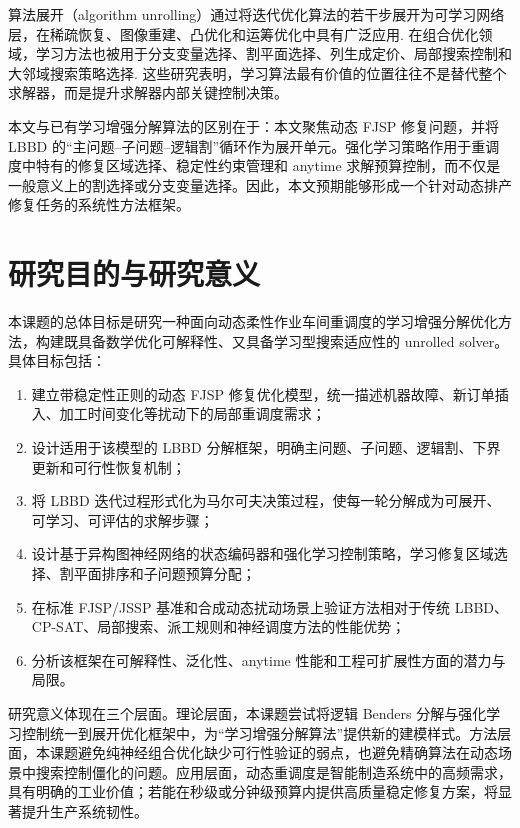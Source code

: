 \documentclass[UTF8,12pt,a4paper]{ctexart}
\begin{document}
算法展开（algorithm unrolling）通过将迭代优化算法的若干步展开为可学习网络层，在稀疏恢复、图像重建、凸优化和运筹优化中具有广泛应用\cite{ref_unrolling}. 在组合优化领域，学习方法也被用于分支变量选择、割平面选择、列生成定价、局部搜索控制和大邻域搜索策略选择\cite{ref_learning_branch,ref_learning_cut,ref_learning_lns}. 这些研究表明，学习算法最有价值的位置往往不是替代整个求解器，而是提升求解器内部关键控制决策。

本文与已有学习增强分解算法的区别在于：本文聚焦动态 FJSP 修复问题，并将 LBBD 的“主问题--子问题--逻辑割”循环作为展开单元。强化学习策略作用于重调度中特有的修复区域选择、稳定性约束管理和 anytime 求解预算控制，而不仅是一般意义上的割选择或分支变量选择。因此，本文预期能够形成一个针对动态排产修复任务的系统性方法框架。

\section{研究目的与研究意义}

本课题的总体目标是研究一种面向动态柔性作业车间重调度的学习增强分解优化方法，构建既具备数学优化可解释性、又具备学习型搜索适应性的 unrolled solver。具体目标包括：

\begin{enumerate}
    \item 建立带稳定性正则的动态 FJSP 修复优化模型，统一描述机器故障、新订单插入、加工时间变化等扰动下的局部重调度需求；
    \item 设计适用于该模型的 LBBD 分解框架，明确主问题、子问题、逻辑割、下界更新和可行性恢复机制；
    \item 将 LBBD 迭代过程形式化为马尔可夫决策过程，使每一轮分解成为可展开、可学习、可评估的求解步骤；
    \item 设计基于异构图神经网络的状态编码器和强化学习控制策略，学习修复区域选择、割平面排序和子问题预算分配；
    \item 在标准 FJSP/JSSP 基准和合成动态扰动场景上验证方法相对于传统 LBBD、CP-SAT、局部搜索、派工规则和神经调度方法的性能优势；
    \item 分析该框架在可解释性、泛化性、anytime 性能和工程可扩展性方面的潜力与局限。
\end{enumerate}

研究意义体现在三个层面。理论层面，本课题尝试将逻辑 Benders 分解与强化学习控制统一到展开优化框架中，为“学习增强分解算法”提供新的建模样式。方法层面，本课题避免纯神经组合优化缺少可行性验证的弱点，也避免精确算法在动态场景中搜索控制僵化的问题。应用层面，动态重调度是智能制造系统中的高频需求，具有明确的工业价值；若能在秒级或分钟级预算内提供高质量稳定修复方案，将显著提升生产系统韧性。
\end{document}
